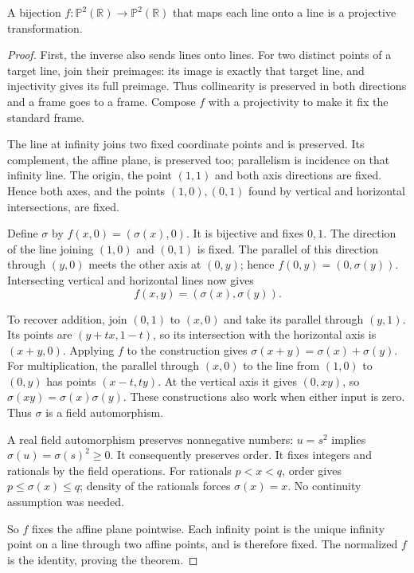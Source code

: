 \begin{theorem}\label{geometry:thm:fundamental}
A bijection $f:\mathbb P^2(\mathbb R)\to\mathbb P^2(\mathbb R)$ that maps each line onto a line is a projective transformation.
\end{theorem}
\begin{proof}
First, the inverse also sends lines onto lines. For two distinct points of a target line, join their preimages: its image is exactly that target line, and injectivity gives its full preimage. Thus collinearity is preserved in both directions and a frame goes to a frame. Compose $f$ with a projectivity to make it fix the standard frame.

The line at infinity joins two fixed coordinate points and is preserved. Its complement, the affine plane, is preserved too; parallelism is incidence on that infinity line. The origin, the point $(1,1)$ and both axis directions are fixed. Hence both axes, and the points $(1,0),(0,1)$ found by vertical and horizontal intersections, are fixed.

Define $\sigma$ by $f(x,0)=(\sigma(x),0)$. It is bijective and fixes $0,1$. The direction of the line joining $(1,0)$ and $(0,1)$ is fixed. The parallel of this direction through $(y,0)$ meets the other axis at $(0,y)$; hence $f(0,y)=(0,\sigma(y))$. Intersecting vertical and horizontal lines now gives
\[
f(x,y)=(\sigma(x),\sigma(y)).
\]

To recover addition, join $(0,1)$ to $(x,0)$ and take its parallel through $(y,1)$. Its points are $(y+tx,1-t)$, so its intersection with the horizontal axis is $(x+y,0)$. Applying $f$ to the construction gives $\sigma(x+y)=\sigma(x)+\sigma(y)$. For multiplication, the parallel through $(x,0)$ to the line from $(1,0)$ to $(0,y)$ has points $(x-t,ty)$. At the vertical axis it gives $(0,xy)$, so $\sigma(xy)=\sigma(x)\sigma(y)$. These constructions also work when either input is zero. Thus $\sigma$ is a field automorphism.

A real field automorphism preserves nonnegative numbers: $u=s^2$ implies $\sigma(u)=\sigma(s)^2\ge0$. It consequently preserves order. It fixes integers and rationals by the field operations. For rationals $p<x<q$, order gives $p\le\sigma(x)\le q$; density of the rationals forces $\sigma(x)=x$. No continuity assumption was needed.

So $f$ fixes the affine plane pointwise. Each infinity point is the unique infinity point on a line through two affine points, and is therefore fixed. The normalized $f$ is the identity, proving the theorem.
\end{proof}

